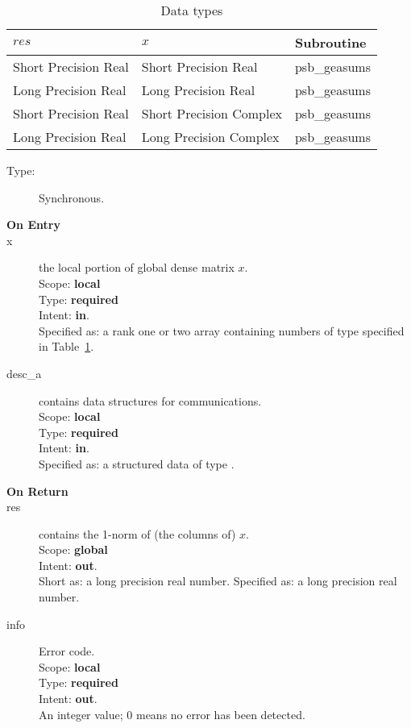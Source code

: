 \begin{table}[h]
\begin{center}
\begin{tabular}{lll}
\hline
$res$ & $x$ & {\bf Subroutine}\\
\hline
Short Precision Real&Short Precision Real & psb\_geasums \\
Long Precision Real&Long Precision Real & psb\_geasums \\
Short Precision Real&Short Precision Complex & psb\_geasums \\
Long Precision Real&Long Precision Complex & psb\_geasums \\
\hline
\end{tabular}
\end{center}
\caption{Data types\label{tab:f90asums}}
\end{table}

\begin{description}
\item[Type:] Synchronous.
\item[\bf On Entry]
\item[x] the local portion of global dense matrix
$x$. %
\\
Scope: {\bf local} \\
Type: {\bf required} \\
Intent: {\bf in}.\\
Specified as: a rank one or two array 
containing numbers of type specified in
Table~\ref{tab:f90asums}.
\item[desc\_a] contains data structures for communications.\\
Scope: {\bf local} \\
Type: {\bf required}\\
Intent: {\bf in}.\\
Specified as: a structured data of type \descdata.

\item[\bf On Return] 
\item[res] contains the 1-norm of (the columns of) $x$.\\
Scope: {\bf global} \\
Intent: {\bf out}.\\
Short as: a long precision real  number.
Specified as: a long precision real  number.
\item[info] Error code.\\
Scope: {\bf local} \\
Type: {\bf required} \\
Intent: {\bf out}.\\
An integer value; 0 means no error has been detected. 
\end{description}


